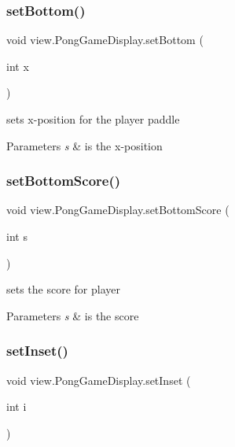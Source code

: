 \subsubsection{\texorpdfstring{set\+Bottom()}{setBottom()}}
{\footnotesize\ttfamily void view.\+Pong\+Game\+Display.\+set\+Bottom (\begin{DoxyParamCaption}\item[{int}]{x }\end{DoxyParamCaption})}



sets x-\/position for the player paddle 


\begin{DoxyParams}{Parameters}
{\em s} & is the x-\/position \\
\hline
\end{DoxyParams}
\hypertarget{classview_1_1_pong_game_display_aa1ef677f1bae92a51750732099b1609a}{}\label{classview_1_1_pong_game_display_aa1ef677f1bae92a51750732099b1609a} 
\subsubsection{\texorpdfstring{set\+Bottom\+Score()}{setBottomScore()}}
{\footnotesize\ttfamily void view.\+Pong\+Game\+Display.\+set\+Bottom\+Score (\begin{DoxyParamCaption}\item[{int}]{s }\end{DoxyParamCaption})}



sets the score for player 


\begin{DoxyParams}{Parameters}
{\em s} & is the score \\
\hline
\end{DoxyParams}
\hypertarget{classview_1_1_pong_game_display_ac40ce3811b6118c530980d38aa48ec64}{}\label{classview_1_1_pong_game_display_ac40ce3811b6118c530980d38aa48ec64} 
\subsubsection{\texorpdfstring{set\+Inset()}{setInset()}}
{\footnotesize\ttfamily void view.\+Pong\+Game\+Display.\+set\+Inset (\begin{DoxyParamCaption}\item[{int}]{i }\end{DoxyParamCaption})}



